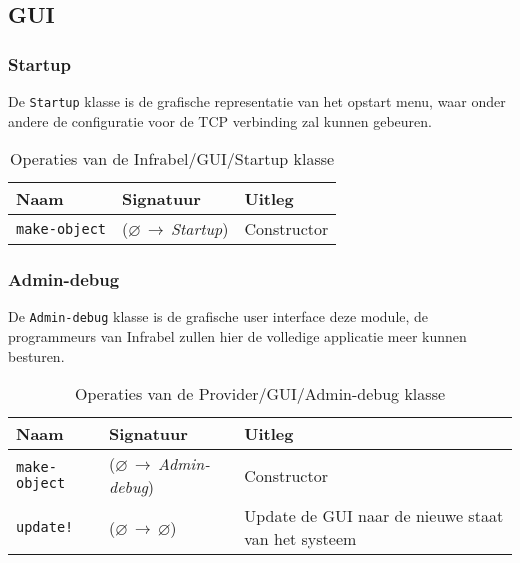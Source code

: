 \documentclass[a4paper, 11pt]{article}
\newcommand{\naar}{\,$\rightarrow$\,}
\renewcommand{\empty}{$\varnothing$}
\newcommand{\<}{\scriptsize\textless\normalsize}
\renewcommand{\>}{\scriptsize\textgreater\normalsize}
\begin{document}
\subsection{GUI} %

\subsubsection{Startup} %
De \texttt{Startup} klasse is de grafische representatie van het opstart menu, waar onder andere de configuratie voor de TCP verbinding zal kunnen gebeuren.
\begin{table}[H]
	\begin{center}
		{
		\begin{tabular}{|l l l|}
			\hline
			\textbf{Naam} & \textbf{Signatuur} & \textbf{Uitleg}\\
			\hline
			\texttt{make-object} & (\empty \naar \textit{Startup}) & Constructor\\
			\hline
		\end{tabular}}
		\caption{Operaties van de Infrabel/GUI/Startup klasse}
	\end{center}
\end{table}

\newpage

\subsubsection{Admin-debug} %
De \texttt{Admin-debug} klasse is de grafische user interface deze module, de programmeurs van Infrabel zullen hier de volledige applicatie meer kunnen besturen.
\begin{table}[H]
	\begin{center}
		{
		\begin{tabular}{|l l l|}
			\hline
			\textbf{Naam} & \textbf{Signatuur} & \textbf{Uitleg}\\
			\hline
			\texttt{make-object} & (\empty \naar \textit{Admin-debug}) & Constructor\\
			\hline
			\texttt{update!} & (\empty \naar \empty) & Update de GUI naar de nieuwe staat van het systeem\\
			\hline
		\end{tabular}}
		\caption{Operaties van de Provider/GUI/Admin-debug klasse}
	\end{center}
\end{table}
\end{document}
